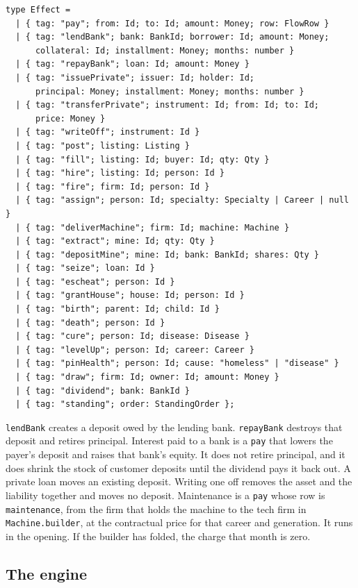 \documentclass[11pt]{article}
\newenvironment{keep}{\noindent\begin{minipage}{\linewidth}}{\end{minipage}}
\begin{document}
\begin{keep}
\begin{lstlisting}
type Effect =
  | { tag: "pay"; from: Id; to: Id; amount: Money; row: FlowRow }
  | { tag: "lendBank"; bank: BankId; borrower: Id; amount: Money;
      collateral: Id; installment: Money; months: number }
  | { tag: "repayBank"; loan: Id; amount: Money }
  | { tag: "issuePrivate"; issuer: Id; holder: Id;
      principal: Money; installment: Money; months: number }
  | { tag: "transferPrivate"; instrument: Id; from: Id; to: Id;
      price: Money }
  | { tag: "writeOff"; instrument: Id }
  | { tag: "post"; listing: Listing }
  | { tag: "fill"; listing: Id; buyer: Id; qty: Qty }
  | { tag: "hire"; listing: Id; person: Id }
  | { tag: "fire"; firm: Id; person: Id }
  | { tag: "assign"; person: Id; specialty: Specialty | Career | null }
  | { tag: "deliverMachine"; firm: Id; machine: Machine }
  | { tag: "extract"; mine: Id; qty: Qty }
  | { tag: "depositMine"; mine: Id; bank: BankId; shares: Qty }
  | { tag: "seize"; loan: Id }
  | { tag: "escheat"; person: Id }
  | { tag: "grantHouse"; house: Id; person: Id }
  | { tag: "birth"; parent: Id; child: Id }
  | { tag: "death"; person: Id }
  | { tag: "cure"; person: Id; disease: Disease }
  | { tag: "levelUp"; person: Id; career: Career }
  | { tag: "pinHealth"; person: Id; cause: "homeless" | "disease" }
  | { tag: "draw"; firm: Id; owner: Id; amount: Money }
  | { tag: "dividend"; bank: BankId }
  | { tag: "standing"; order: StandingOrder };
\end{lstlisting}
\end{keep}

\texttt{lendBank} creates a deposit owed by the lending bank.
\texttt{repayBank} destroys that deposit and retires principal.
Interest paid to a bank is a \texttt{pay} that lowers the payer's deposit
and raises that bank's equity. It does not retire principal, and it does
shrink the stock of customer deposits until the dividend pays it back out.
A private loan moves an existing deposit. Writing one off removes the asset
and the liability together and moves no deposit.
Maintenance is a \texttt{pay} whose row is \texttt{maintenance}, from the
firm that holds the machine to the tech firm in \texttt{Machine.builder},
at the contractual price for that career and generation. It runs in the
opening. If the builder has folded, the charge that month is zero.

\subsection{The engine}
\label{sec:engine}
\end{document}
